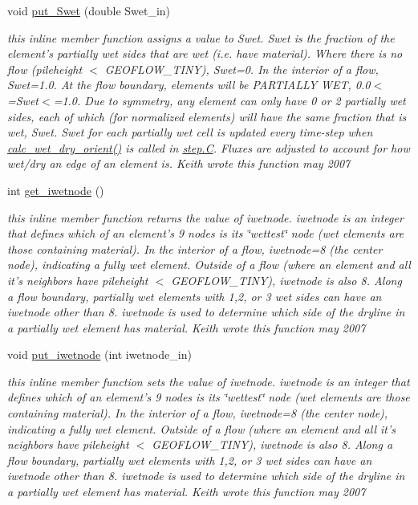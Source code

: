 \begin{CompactItemize}
void \hyperlink{classElement_a124}{put\_\-Swet} (double Swet\_\-in)
\begin{CompactList}\small\item\em this inline member function assigns a value to Swet. Swet is the fraction of the element's partially wet sides that are wet (i.e. have material). Where there is no flow (pileheight $<$ GEOFLOW\_\-TINY), Swet=0. In the interior of a flow, Swet=1.0. At the flow boundary, elements will be PARTIALLY WET, 0.0$<$=Swet$<$=1.0. Due to symmetry, any element can only have 0 or 2 partially wet sides, each of which (for normalized elements) will have the same fraction that is wet, Swet. Swet for each partially wet cell is updated every time-step when \hyperlink{classElement_a129}{calc\_\-wet\_\-dry\_\-orient()} is called in \hyperlink{constant_8h_a21}{step.C}. Fluxes are adjusted to account for how wet/dry an edge of an element is. Keith wrote this function may 2007 \item\end{CompactList}\item 
int \hyperlink{classElement_a125}{get\_\-iwetnode} ()
\begin{CompactList}\small\item\em this inline member function returns the value of iwetnode. iwetnode is an integer that defines which of an element's 9 nodes is its \char`\"{}wettest\char`\"{} node (wet elements are those containing material). In the interior of a flow, iwetnode=8 (the center node), indicating a fully wet element. Outside of a flow (where an element and all it's neighbors have pileheight $<$ GEOFLOW\_\-TINY), iwetnode is also 8. Along a flow boundary, partially wet elements with 1,2, or 3 wet sides can have an iwetnode other than 8. iwetnode is used to determine which side of the dryline in a partially wet element has material. Keith wrote this function may 2007 \item\end{CompactList}\item 
void \hyperlink{classElement_a126}{put\_\-iwetnode} (int iwetnode\_\-in)
\begin{CompactList}\small\item\em this inline member function sets the value of iwetnode. iwetnode is an integer that defines which of an element's 9 nodes is its \char`\"{}wettest\char`\"{} node (wet elements are those containing material). In the interior of a flow, iwetnode=8 (the center node), indicating a fully wet element. Outside of a flow (where an element and all it's neighbors have pileheight $<$ GEOFLOW\_\-TINY), iwetnode is also 8. Along a flow boundary, partially wet elements with 1,2, or 3 wet sides can have an iwetnode other than 8. iwetnode is used to determine which side of the dryline in a partially wet element has material. Keith wrote this function may 2007 \item\end{CompactList}\item 

\end{CompactItemize}
